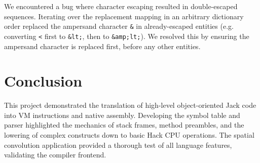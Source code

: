 \documentclass[11pt,a4paper]{article}
\begin{document}
We encountered a bug where character escaping resulted in double-escaped sequences. Iterating over the replacement mapping in an arbitrary dictionary order replaced the ampersand character \texttt{\&} in already-escaped entities (e.g. converting \texttt{<} first to \texttt{\&lt;}, then to \texttt{\&amp;lt;}). We resolved this by ensuring the ampersand character is replaced first, before any other entities.

\section{Conclusion}

This project demonstrated the translation of high-level object-oriented Jack code into VM instructions and native assembly. Developing the symbol table and parser highlighted the mechanics of stack frames, method preambles, and the lowering of complex constructs down to basic Hack CPU operations. The spatial convolution application provided a thorough test of all language features, validating the compiler frontend.
\end{document}
